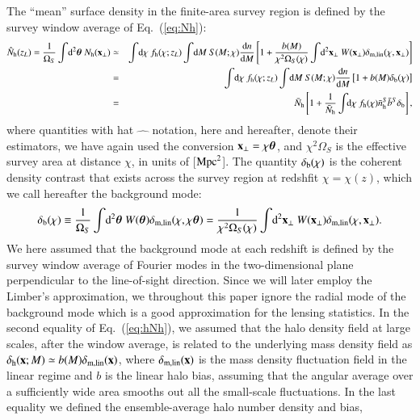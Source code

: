 \documentclass[onecolumn,notitlepage,showpacs,amsmath,amssymb,prd,floatfix]{revtex4-1}
\newcommand{\bx}{{\bf x}}
\newcommand{\btheta}{{\bm{\theta}}}
\newcommand{\dr}{\mathrm{d}}
\newcommand{\deltab}{\delta_{\rm b}}
\newcommand{\deltaml}{\delta_{\mathrm{m,lin}}}
\newcommand{\deltah}{\delta_{\mathrm{h}}}
\newcommand{\bh}{\mathrm{h}}
\newcommand{\bnhs}{\bar{n}_{\rm h}^S}
\newcommand{\hNh}{\hat{N}_{\rm h}}
\newcommand{\bNh}{\bar{N}_{\rm h}}
\newcommand{\hnh}{\hat{n}_{\mathrm{h}}}
\begin{document}
The ``mean'' surface density in the finite-area survey region is defined
by the survey window average of Eq.~(\ref{eq:Nh}):
%
\begin{eqnarray}
 \hNh(z_L)=\frac{1}{\Omega_S}\int\!\dr^2\btheta~N_{\rm h}(\bx_\perp)
 &\simeq &\int\!\dr\chi~f_\bh(\chi;z_L)\int\!\dr M~S(M;\chi)\frac{\dr
 n}{\dr M}\left[
	       1+\frac{b(M)}{\chi^2\Omega_S(\chi)}\int\!\dr^2\bx_\perp~W(\bx_\perp)
	       \deltaml(\chi,\bx_\perp)\right]\nonumber\\
&=&\int\!\dr\chi~f_\bh(\chi;z_L)\int\!\dr M~S(M;\chi)\frac{\dr n}{\dr
 M}\left[1+b(M)\deltab(\chi)\right]\nonumber\\
&=& \bNh\left[1+\frac{1}{\bNh}\int\!\!\dr\chi~f_{\rm h}(\chi)\bnhs\bar{b}^S\deltab\right],
\label{eq:hNh}
\end{eqnarray}
%
where quantities with hat $\hat{\hspace{1em}}$ notation, here and
hereafter, denote their estimators, we have again used the conversion
$\bx_\perp =\chi\btheta$, and $\chi^2\Omega_S$ is the effective survey
area
at distance $\chi$, in units of [${\rm Mpc}^2$].
The quantity $\deltab(\chi)$ is the coherent density contrast that
exists across the survey region at redshfit $\chi=\chi(z)$, which we
call hereafter the background mode: 
%
\begin{equation}
\deltab(\chi)\equiv
 \frac{1}{\Omega_S}\int\!\dr^2\btheta~W(\btheta)\deltaml(\chi,\chi\btheta)
 =\frac{1}{\chi^2\Omega_S(\chi)}\int\!\dr^2\bx_\perp ~W(\bx_\perp)\deltaml(\chi,\bx_\perp).
\label{eq:deltab}
\end{equation}
%
We here assumed that the background mode at each redshift is defined by
the survey window average of Fourier modes in the two-dimensional plane
perpendicular to the line-of-sight direction. Since we will later employ
the Limber's approximation, we throughout this paper ignore the radial
mode of the background mode which is a good approximation for the
lensing statistics.  In the second equality of Eq.~(\ref{eq:hNh}), we
assumed that the halo density field at large scales, after the window
average, is related to the underlying mass density field as
$\deltah(\bx; M)\simeq b(M)\deltaml(\bx)$, where $\deltaml(\bx)$ is the
mass density fluctuation field in the linear regime and $b$ is the
linear halo bias, assuming that the angular average over a sufficiently
wide area smooths out all the small-scale fluctuations. In the last
equality we defined the ensemble-average halo number density and bias,
\end{document}
